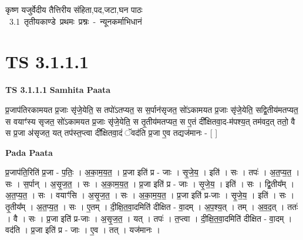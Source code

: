 \documentclass[17pt]{extarticle}
\begin{document}
\begin{titlepage}
    \begin{center}
 
\begin{sanskrit}
    { \Large
    कृष्ण यजुर्वेदीय तैत्तिरीय संहिता,पद,जटा,घन पाठः 
    }
    \\
    \vspace{2.5cm}
    \mbox{ \Large
    3.1     तृतीयकाण्डे प्रथमः प्रश्नः - न्यूनकर्माभिधानं   }
\end{sanskrit}
\end{center}

\end{titlepage}
\tableofcontents
{}
\pagebreak


\section{ TS 3.1.1.1 }

\textbf{TS 3.1.1.1 } \newline
\textbf{Samhita Paata} \newline

प्र॒जाप॑तिरकामयत प्र॒जाः सृ॑जे॒येति॒ स तपो॑ऽतप्यत॒ स स॒र्पान॑सृजत॒ सो॑ऽकामयत प्र॒जाः सृ॑जे॒येति॒ सद्वि॒तीय॑मतप्यत॒ स वयाꣳ॑स्य सृजत॒ सो॑ऽकामयत प्र॒जाः सृ॑जे॒येति॒ स तृ॒तीय॑मतप्यत॒ स ए॒तं दी᳚क्षितवा॒द-म॑पश्य॒त् तम॑वद॒त् ततो॒ वै स प्र॒जा अ॑सृजत॒ यत् तप॑स्त॒प्त्वा दी᳚क्षितवा॒दं ॅवद॑ति प्र॒जा ए॒व तद्यज॑मानः - [  ] \newline

\textbf{Pada Paata} \newline

प्र॒जाप॑ति॒रिति॑ प्र॒जा - प॒तिः॒ । अ॒का॒म॒य॒त॒ । प्र॒जा इति॑ प्र - जाः । सृ॒जे॒य॒ । इति॑ । सः । तपः॑ । अ॒त॒प्य॒त॒ । सः । स॒र्पान् । अ॒सृ॒ज॒त॒ । सः । अ॒का॒म॒य॒त॒ । प्र॒जा इति॑ प्र - जाः । सृ॒जे॒य॒ । इति॑ । सः । द्वि॒तीय᳚म् । अ॒त॒प्य॒त॒ । सः । वयाꣳ॑सि । अ॒सृ॒ज॒त॒ । सः । अ॒का॒म॒य॒त॒ । प्र॒जा इति॑ प्र-जाः । सृ॒जे॒य॒ । इति॑ । सः । तृ॒तीय᳚म् । अ॒त॒प्य॒त॒ । सः । ए॒तम् । दी॒क्षि॒त॒वा॒दमिति॑ दीक्षित - वा॒दम् । अ॒प॒श्य॒त् । तम् । अ॒व॒द॒त् । ततः॑ । वै । सः । प्र॒जा इति॑ प्र-जाः । अ॒सृ॒ज॒त॒ । यत् । तपः॑ । त॒प्त्वा । दी॒क्षि॒त॒वा॒दमिति॑ दीक्षित - वा॒दम् । वद॑ति । प्र॒जा इति॑ प्र - जाः । ए॒व । तत् । यज॑मानः ।  \newline




\end{document}
